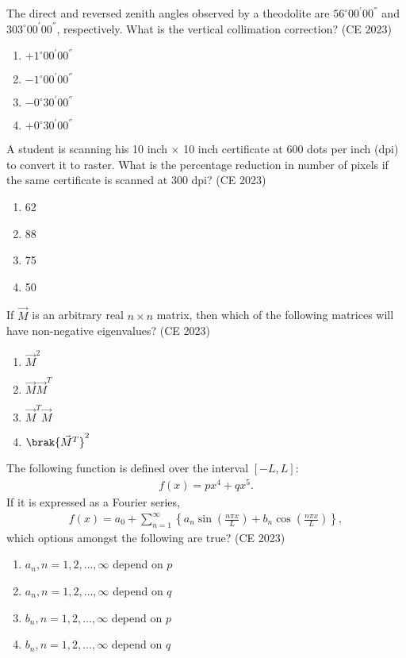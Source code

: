\item The direct and reversed zenith angles observed by a theodolite are $56^{\circ} 00^{'} 00^{''}$ and
$303^{\circ} 00^{'} 00^{''}$, respectively. What is the vertical collimation correction?
\hfill{(CE 2023)}
\begin{enumerate}
\item $+1^{\circ} 00^{'} 00^{''}$
\item $-1^{\circ} 00^{'} 00^{''}$
\item $-0^{\circ} 30^{'} 00^{''}$
\item $+0^{\circ} 30^{'} 00^{''}$
\end{enumerate}
\item  A student is scanning his 10 inch $\times$ 10 inch certificate at 600 dots per inch (dpi) to
convert it to raster. What is the percentage reduction in number of pixels if the same
certificate is scanned at 300 dpi?
\hfill{(CE 2023)}
\begin{enumerate}
\item 62
\item 88
\item 75
\item 50
\end{enumerate}
\item If $\vec{M}$ is an arbitrary real $n\times n$ matrix, then which of the following matrices will
have non-negative eigenvalues?
\hfill{(CE 2023)}
\begin{enumerate}
\item $\vec{M}^2$
\item $\vec{M}\vec{M}^T$
\item $\vec{M}^T\vec{M}$
\item $\brak{\vec{M}^T}^2$
\end{enumerate}
\item The following function is defined over the interval $[-L, L]$:
\begin{align}
f(x) = px^4 + qx^5.
\end{align}
If it is expressed as a Fourier series,
\begin{align}
f(x) = a_0 + \sum_{n=1}^{\infty} \left\{ a_n \sin\left(\frac{n\pi x}{L}\right) + b_n \cos\left(\frac{n\pi x}{L}\right) \right\},
\end{align}
which options amongst the following are true?
\hfill{(CE 2023)}
\begin{enumerate}
\item $a_n, n = 1, 2, \dots, \infty$ depend on $p$
\item $a_n, n = 1, 2, \dots, \infty$ depend on $q$
\item $b_n, n = 1, 2, \dots, \infty$ depend on $p$
\item $b_n, n = 1, 2, \dots, \infty$ depend on $q$
\end{enumerate}
